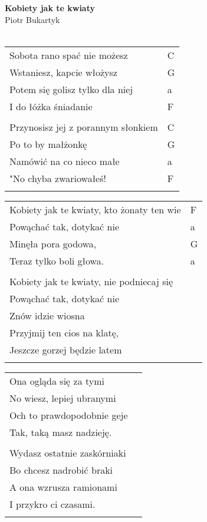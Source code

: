 \documentclass[a5paper]{article}
\begin{document}


\noindent
\fontsize{12pt}{15pt}\selectfont
\textbf{Kobiety jak te kwiaty} \\
\fontsize{8pt}{10pt}\selectfont
Piotr Bukartyk \\ \\
\fontsize{10pt}{12pt}\selectfont
{}
\begin{tabular}{@{}p{9.00cm}p{3cm}@{}}
\noindent
Sobota rano spać nie możesz & C \\
Wstaniesz, kapcie włożysz & G \\
Potem się golisz tylko dla niej & a \\
I do łóżka śniadanie & F \\ \\
Przynosisz jej z porannym słonkiem & C \\
Po to by małżonkę & G \\
Namówić na co nieco małe & a \\
"No chyba zwariowałeś! & F \\ \\
\end{tabular}

\noindent
\begin{tabular}{@{}p{8.00cm}p{3cm}@{}}
Kobiety jak te kwiaty, kto żonaty ten wie & F \\
Powąchać tak, dotykać nie & a \\
Minęła pora godowa, & G \\
Teraz tylko boli głowa. & a \\ \\

Kobiety jak te kwiaty, nie podniecaj się \\
Powąchać tak, dotykać nie \\
Znów idzie wiosna \\
Przyjmij ten cios na klatę, \\
Jeszcze gorzej będzie latem \\ \\
\end{tabular}

\noindent
\begin{tabular}{@{}p{8.00cm}p{3cm}@{}}
Ona ogląda się za tymi \\
No wiesz, lepiej ubranymi \\
Och to prawdopodobnie geje \\
Tak, taką masz nadzieję. \\ \\
Wydasz ostatnie zaskórniaki \\
Bo chcesz nadrobić braki \\
A ona wzrusza ramionami \\
I przykro ci czasami. \\ \\
\end{tabular}
\end{document}
